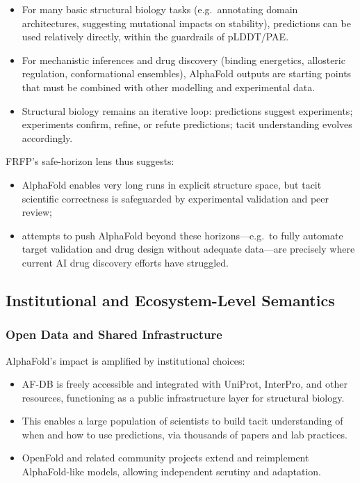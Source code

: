 \begin{itemize}
  \item For many basic structural biology tasks (e.g.\ annotating domain
        architectures, suggesting mutational impacts on stability),
        predictions can be used relatively directly, within the guardrails of
        pLDDT/PAE.
  \item For mechanistic inferences and drug discovery (binding energetics,
        allosteric regulation, conformational ensembles), AlphaFold outputs
        are starting points that must be combined with other modelling and
        experimental data.
  \item Structural biology remains an iterative loop:
        predictions suggest experiments; experiments confirm, refine, or
        refute predictions; tacit understanding evolves accordingly.
\end{itemize}

FRFP’s safe-horizon lens thus suggests:

\begin{itemize}
  \item AlphaFold enables very long runs in explicit structure space, but
        tacit scientific correctness is safeguarded by experimental
        validation and peer review;
  \item attempts to push AlphaFold beyond these horizons---e.g.\ to fully
        automate target validation and drug design without adequate data---are
        precisely where current AI drug discovery efforts have struggled.
\end{itemize}

\subsection{Institutional and Ecosystem-Level Semantics}

\subsubsection*{Open Data and Shared Infrastructure}

AlphaFold’s impact is amplified by institutional choices:

\begin{itemize}
  \item AF-DB is freely accessible and integrated with UniProt, InterPro,
        and other resources, functioning as a public infrastructure layer for
        structural biology.
  \item This enables a large population of scientists to build tacit
        understanding of when and how to use predictions, via thousands of
        papers and lab practices.
  \item OpenFold and related community projects extend and reimplement
        AlphaFold-like models, allowing independent scrutiny and adaptation.
\end{itemize}

